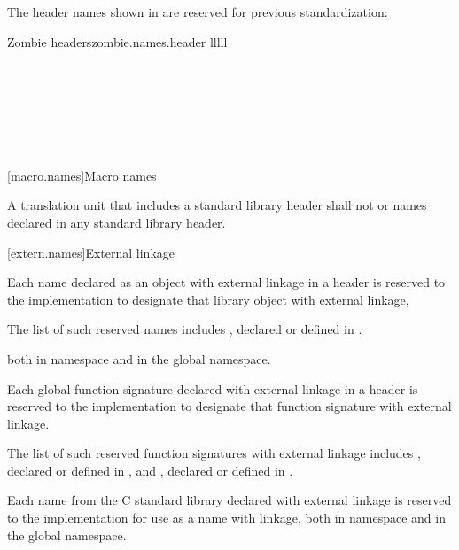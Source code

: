 \pnum
The header names shown in  are reserved for previous
standardization:

\begin{multicolfloattable}{Zombie headers}{zombie.names.header}
{lllll}
 \\
 \\
\columnbreak
{} \\
 \\
\columnbreak
{} \\
\columnbreak
{} \\
\columnbreak
{} \\
\end{multicolfloattable}

[macro.names]{Macro names}

\pnum
{}%
%
A translation unit that includes a standard library header shall not
 or  names declared in any standard
library header.

[extern.names]{External linkage}

\pnum
Each name declared as an object with external linkage
%
in a header is reserved to the implementation to designate that library
object with external linkage,%
%
\begin{footnote}
The list of such reserved names includes
, declared or defined in .
\end{footnote}
both in namespace  and in the global namespace.

\pnum
Each
%
global function signature declared with
%
external linkage in a header is reserved to the
implementation to designate that function signature with
%
external linkage.%
\begin{footnote}
The list of such reserved function
signatures with external linkage includes
%
,
declared or defined in ,
and
%
%
,
declared or defined in
.
\end{footnote}

\pnum
Each name from the C standard library declared with external linkage
%
is reserved to the implementation for use as a name with
%
%
linkage,
both in namespace  and in the global namespace.

